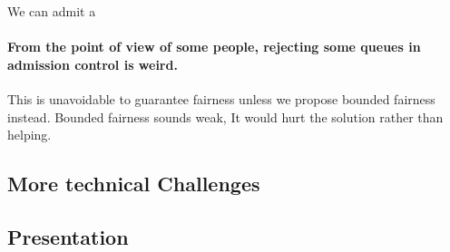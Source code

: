 We can admit a 

\paragraph{From the point of view of some people, rejecting some queues in admission control is weird.} This is unavoidable to guarantee fairness unless we propose bounded fairness instead. Bounded fairness sounds weak, It would hurt the solution rather than helping.


\subsection{More technical Challenges}

\subsection{Presentation}